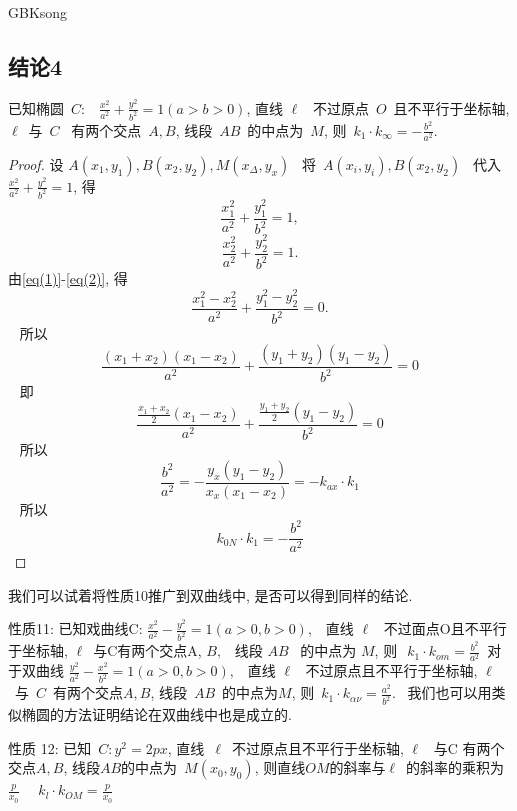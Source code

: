 \documentclass[a4paper, 12pt, twoside]{ctexart}
\begin{document}
\begin{CJK*}{GBK}{song}
\subsection{结论4}
    \begin{propt}\label{propt10}
        已知椭圆~$C:$~  $\frac{x^2}{a^2}+\frac{y^2}{b^2}=1(a>b>0)$, 直线 $\ell$~ 不过原点~$O$~且不平行于坐标轴, $\ell$~与~$C$~ 有两个交点~$A,B$,   线段~$AB$~的中点为~$M$, 则~$k_1\cdot k_{\infty}=-\frac{b^2}{a^2}$.
    \end{propt}
    \begin{proof}
        设 $A(x_1, y_1),  B(x_2,y_2),  M\left(x_{\Delta},  y_{x}\right)$~ 将~$A(x_i,y_i),  B(x_2,y_2)$~
代入~$\frac{x^2}{a^2}+\frac{y^2}{b^2}=1$, 得~
    \begin{equation}\label{eq(1)}
        \frac{x_1^{2}}{a^2}+\frac{y_{1}^{2}}{b^2}=1,
    \end{equation}
    \begin{equation}\label{eq(2)}
        \frac{x_2^{2}}{a^2}+\frac{y_{2}^{2}}{b^2}=1.
    \end{equation}
    由\eqref{eq(1)}-\eqref{eq(2)}, 得
    $$\frac{x_1^{2}-x_2^{2}}{a^2}+\frac{y_{1}^{2}-y_{2}^{2}}{b^2}=0.$$~
所以 $$~\frac{\left(x_1+x_2\right)\left(x_1-x_2\right)}{a^2}+\frac{\left(y_{1}+y_{2}\right)\left(y_{1}-y_{2}\right)}{b^2}=0~$$~
即 $$~\frac{\frac{x_1+x_2}{2}\left(x_1-x_2\right)}{a^2}+\frac{\frac{y_{1}+y_{2}}{2}\left(y_{1}-y_{2}\right)}{b^2}=0~$$~
所以
~$$~\frac{b^2}{a^2}=-\frac{y_{x}\left(y_{1}-y_{2}\right)}{x_{x}\left(x_1-x_2\right)}=-k_{a x} \cdot k_{1}~$$~
所以
~$$~
k_{0 N} \cdot k_{1}=-\frac{b^2}{a^2}
~$$
\end{proof}

    我们可以试着将性质10推广到双曲线中, 是否可以得到同样的结论.

    性质11: 已知戏曲线C:  $\frac{x^2}{a^2}-\frac{y^2}{b^2}=1(a>0,  b>0), $~ 直线 $\ell$~ 不过面点O且不平行于坐标轴,  $\ell$~与C有两个交点A,  $B, $~ 线段 $A B$~ 的中点为 $M$,  则~$\ k_{1} \cdot k_{o m}=\frac{b^2}{a^2}$~对于双曲线 $\frac{y^2}{a^2}-\frac{x^2}{b^2}=1(a>0,  b>0), $~ 直线 $\ell$~ 不过原点且不平行于坐标轴, $\ell$~与~$C$~有两个交点$A,B$, 线段~$AB$~的中点为$M$, 则~$k_{1} \cdot k_{\alpha \nu}=\frac{a^2}{b^2} .$~ 我们也可以用类似椭圆的方法证明结论在双曲线中也是成立的.

    性质 12: 已知~$C: y^2 =2px$,  直线~$\ell$~不过原点且不平行于坐标轴,   $\ell$~ 与C 有两个交点$A, B$,  线段$AB$的中点为~$M(x_0, y_0)$,  则直线$OM$的斜率与$\ell$~的斜率的乘积为 $\frac{p}{x_0}$~
~$k_{l}\cdot k_{O M}=\frac{p}{x_0} $~
 

\end{CJK*}
\end{document}
